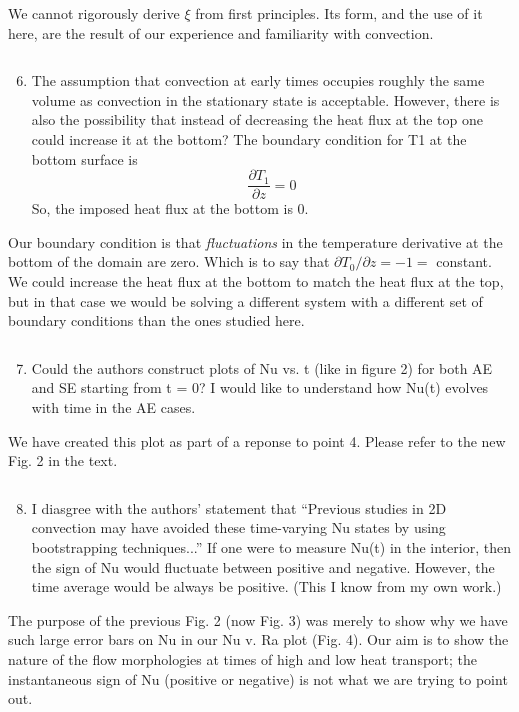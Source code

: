 \documentclass[aps, 11pt, singlecolumn]{revtex4-1} %
\begin{document}
\begin{singlespace}
We cannot rigorously derive $\xi$ from first principles. Its form, and the use of
it here, are the result of our experience and familiarity with convection. 

\begin{myquotation}
$\,$\\\vspace{-1.25cm}
\begin{enumerate}
\setcounter{enumi}{5}
\item The assumption that convection at early times occupies roughly the same volume as convection in the stationary state is acceptable. However, there is also the possibility that instead of decreasing the heat flux at the top one could increase it at the bottom? The boundary condition for T1 at the bottom surface is
$$
\frac{\partial T_1}{\partial z} = 0
$$
So, the imposed heat flux at the bottom is 0.
\end{enumerate}
\end{myquotation}
Our boundary condition is that \emph{fluctuations} in the temperature derivative at the
bottom of the domain are zero. Which is to say that 
$\partial T_0 / \partial z = -1 =$ constant. We could increase the heat flux at
the bottom to match the heat flux at the top, but in that case we would be solving
a different system with a different set of boundary conditions than the ones
studied here. 

\begin{myquotation}
$\,$\\\vspace{-1.25cm}
\begin{enumerate}
\setcounter{enumi}{6}
\item Could the authors construct plots of Nu vs. t (like in figure 2) for both AE and SE starting from t = 0? I would like to understand how Nu(t) evolves with time in the AE cases.
\end{enumerate}
\end{myquotation}
We have created this plot as part of a reponse to point 4. Please refer to the
new Fig. 2 in the text.

\begin{myquotation}
$\,$\\\vspace{-1.25cm}
\begin{enumerate}
\setcounter{enumi}{7}
\item I diasgree with the authors’ statement that “Previous studies in 2D convection may have avoided these time-varying Nu states by using bootstrapping techniques...” If one were to measure Nu(t) in the interior, then the sign of Nu would fluctuate between positive and negative. However, the time average would be always be positive. (This I know from my own work.)
\end{enumerate}
\end{myquotation}
The purpose of the previous Fig. 2 (now Fig. 3) was merely to show why we have
such large error bars on Nu in our Nu v. Ra plot (Fig. 4). Our aim is to show
the nature of the flow morphologies at times of high and low heat transport;
the instantaneous sign of Nu (positive or negative) is not what we are trying
to point out.


\end{singlespace}
\end{document}
